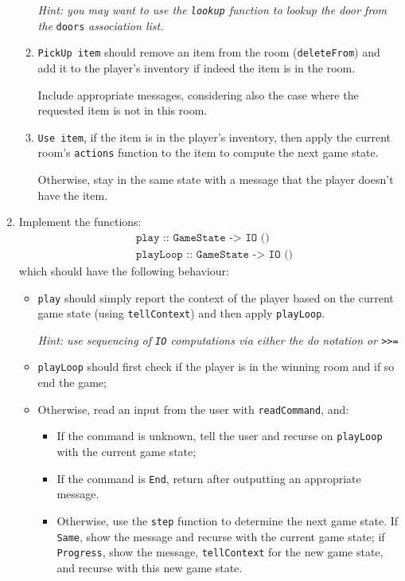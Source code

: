 \documentclass{article}
\newcommand{\topMarks}[1]{\marginnote{(#1 marks)}}
\begin{document}
\begin{enumerate}[leftmargin=1.4em,resume]
\begin{enumerate}
\emph{Hint: you may want to use the \texttt{lookup} function to
lookup the door from the} \texttt{doors} \emph{association list.}

\item \texttt{PickUp item} should
remove an item from the room (\texttt{deleteFrom}) and add it to the player's
inventory if indeed the item is in the room.

Include appropriate messages, considering also the case where
the requested item is not in this room.

\item \texttt{Use item}, if the item
is in the player's inventory, then
apply the current room's \texttt{actions} function
to the item to compute the next game state.

Otherwise, stay in the same state with a message
that the player doesn't have the item.
\end{enumerate}

\item \topMarks{12} Implement the functions:
%
\begin{align*}
& \texttt{play :: GameState -> IO ()} \\
& \texttt{playLoop :: GameState -> IO ()}
\end{align*}
%
which should have the following behaviour:
%
\begin{itemize}
\item \texttt{play} should simply report the context of the player based on the current game state
  (using \texttt{tellContext}) and then apply \texttt{playLoop}.

\emph{Hint: use sequencing of \texttt{IO} computations via either
the \emph{do} notation or \texttt{>>=}}
%
\item \texttt{playLoop} should first check if the player is in the winning room
  and if so end the game;
\item Otherwise, read an input from the user with \texttt{readCommand}, and:
 \begin{itemize}[leftmargin=1em]
   \item If the command is unknown, tell the user and recurse on
     \texttt{playLoop} with the current game state;
   \item If the command is \texttt{End}, return after outputting an
     appropriate message.
   \item Otherwise, use the \texttt{step} function to determine
     the next game state. If \texttt{Same}, show the
     message and recurse with the current game state; if
     \texttt{Progress}, show the message, \texttt{tellContext} for the
     new game state, and recurse with this new game state.
\end{itemize}
\end{itemize}


\end{enumerate}
\end{document}
